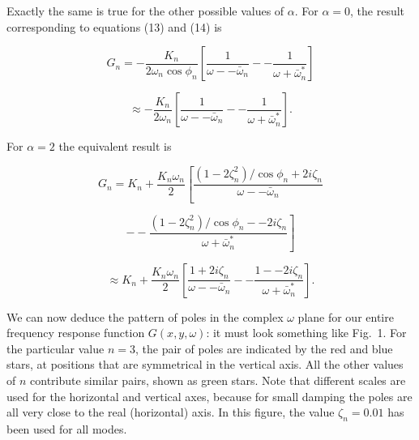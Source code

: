   Exactly the same is true for the other possible values of $\alpha$. For 
  $\alpha = 0$, the result corresponding to equations (13) and (14) is 

  \begin{equation*}G_n = -\dfrac{K_n}{2 \omega_n \cos \phi_n} 
  \left[\dfrac{1}{\omega -- \bar{\omega}_n} -- \dfrac{1}{\omega + 
  \bar{\omega}^*_n} \right] \tag{17}\end{equation*} 

  \begin{equation*}\approx -\dfrac{K_n}{2 \omega_n } \left[\dfrac{1}{\omega -- 
  \bar{\omega}_n} -- \dfrac{1}{\omega + \bar{\omega}^*_n} \right] . 
  \tag{18}\end{equation*} 

  For $\alpha = 2$ the equivalent result is 

  \begin{equation*}G_n = K_n+\dfrac{K_n \omega_n}{2} 
  \left[\dfrac{(1-2\zeta_n^2)/\cos \phi_n + 2 i \zeta_n}{\omega -- 
  \bar{\omega}_n}\right.\end{equation*} 

  \begin{equation*}\left. -- \dfrac{(1-2\zeta_n^2)/\cos \phi_n -- 2 i 
  \zeta_n}{\omega + \bar{\omega}^*_n} \right] \tag{19}\end{equation*} 

  \begin{equation*}\approx K_n+\dfrac{K_n \omega_n}{2} \left[\dfrac{1 + 2 i 
  \zeta_n}{\omega -- \bar{\omega}_n} -- \dfrac{1 -- 2 i \zeta_n}{\omega + 
  \bar{\omega}^*_n} \right] . \tag{20}\end{equation*} 

  We can now deduce the pattern of poles in the complex $\omega$ plane for our 
  entire frequency response function $G(x,y,\omega)$: it must look something 
  like Fig.\ 1. For the particular value $n=3$, the pair of poles are indicated 
  by the red and blue stars, at positions that are symmetrical in the vertical 
  axis. All the other values of $n$ contribute similar pairs, shown as green 
  stars. Note that different scales are used for the horizontal and vertical 
  axes, because for small damping the poles are all very close to the real 
  (horizontal) axis. In this figure, the value $\zeta_n = 0.01$ has been used 
  for all modes. 


